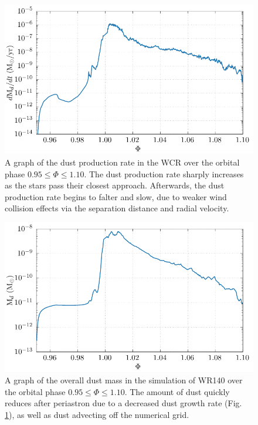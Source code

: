 \documentclass[fleqn,usenatbib]{mnras}
\begin{document}
\begin{figure}
  \centering
  \includegraphics[width=\linewidth]{assets/wr140-dust_rate.pdf}
  \caption[A graph of the dust production rate in the WCR over the orbital phase $0.95 \leq \Phi \leq 1.10$]{A graph of the dust production rate in the WCR over the orbital phase $0.95 \leq \Phi \leq 1.10$. The dust production rate sharply increases as the stars pass their closest approach. Afterwards, the dust production rate begins to falter and slow, due to weaker wind collision effects via the separation distance and radial velocity.}
  \label{fig:wr140-dustproduction}
\end{figure}

\begin{figure}
  \centering
  \includegraphics[width=\linewidth]{assets/wr140-m_dust.pdf}
  \caption[A graph of the overall dust mass in the simulation of WR140 over the orbital phase $0.95 \leq \Phi \leq 1.10$]{A graph of the overall dust mass in the simulation of WR140 over the orbital phase $0.95 \leq \Phi \leq 1.10$. The amount of dust quickly reduces after periastron due to a decreased dust growth rate (Fig. \ref{fig:wr140-dustproduction}), as well as dust advecting off the numerical grid.}
  \label{fig:wr140-dustmass}
\end{figure}
\end{document}
